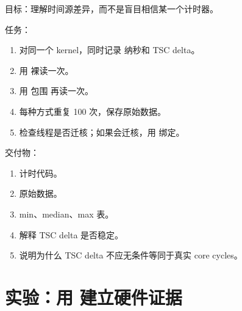 \begin{labbox}
目标：理解时间源差异，而不是盲目相信某一个计时器。

任务：

\begin{enumerate}
  \item 对同一个  kernel，同时记录  纳秒和 TSC delta。
  \item 用  裸读一次。
  \item 用  包围  再读一次。
  \item 每种方式重复 100 次，保存原始数据。
  \item 检查线程是否迁核；如果会迁核，用  绑定。
\end{enumerate}

交付物：

\begin{enumerate}
  \item 计时代码。
  \item 原始数据。
  \item min、median、max 表。
  \item 解释 TSC delta 是否稳定。
  \item 说明为什么 TSC delta 不应无条件等同于真实 core cycles。
\end{enumerate}
\end{labbox}

\section{实验：用  建立硬件证据}

